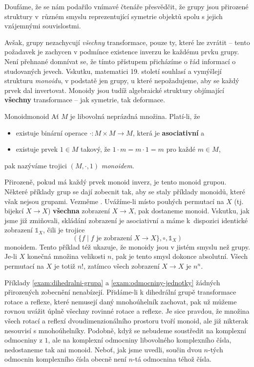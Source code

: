 Doufáme, že se nám podařilo vnímavé čtenáře přesvědčit, že grupy jsou přirozené
struktury v~různém smyslu reprezentující symetrie objektů spolu s jejich
vzájemnými souvislostmi.

Avšak, grupy nezachycují \emph{všechny} transformace, pouze ty, které lze
zvrátit -- tento požadavek je zachycen v podmínce existence inverzu ke každému
prvku grupy. Není přehnané domnívat se, že tímto přístupem přicházíme o řád
informací o studovaných jevech. Vskutku, matematici 19. století souhlasí a
vymýšlejí strukturu \emph{monoidu}, v podstatě jen grupy, u které nepožadujeme,
aby se každý prvek dal invertovat. Monoidy jsou tudíž algebraické struktury
objímající \textbf{všechny} transformace -- jak symetrie, tak deformace.

\begin{definition}{Monoid}{monoid}
 Ať $M$ je libovolná neprázdná množina. Platí-li, že
 \begin{itemize}
  \item existuje binární operace $ \cdot :M \times M \to M$, která je
   \textbf{asociativní} a
  \item existuje prvek $1 \in M$ takový, že $1 \cdot m = m \cdot 1 = m$ pro
   každé $m \in M$,
 \end{itemize}
 pak nazýváme trojici $(M, \cdot ,1)$ \emph{monoidem}.
\end{definition}

Přirozeně, pokud má každý prvek monoid inverz, je tento monoid grupou. Některé
příklady grup se dají zobecnit tak, aby se staly příklady monoidů, které však
nejsou grupami. Vezměme . Uvážíme-li místo
pouhých permutací na $X$ (tj. bijekcí $X \to X$) \textbf{všechna} zobrazení $X
\to X$, pak dostaneme monoid. Vskutku, jak jsme již zmiňovali, skládání
zobrazení je asociativní a máme k~dispozici identické zobrazení $\mathds{1}_X$,
čili je trojice
\[
 (\{f \mid f \text{ je zobrazení } X \to X\}, \circ ,\mathds{1}_X)
\]
monoidem. Tento příklad též ukazuje, že monoidy jsou v jistém smyslu 
než grupy. Je-li $X$ konečná množina velikosti $n$, pak je tento smysl dokonce
absolutní. Všech permutací na $X$ je totiž $n!$, zatímco všech zobrazení $X \to
X$ je $n^{n}$.

Příklady \ref{exam:dihedralni-grupa} a \ref{exam:odmocniny-jednotky} žádných
přirozených zobecnění nenabízejí. Přidáme-li k dihedrální grupě transformace
rotace a reflexe, které nemusejí daný mnohoúhelník zachovat, pak už můžeme
rovnou uvážit úplně všechny rovinné rotace a reflexe. Je sice pravdou, že
množina všech rotací a reflexí dvoudimenzionálního prostoru tvoří monoid, ale
již nikterak nesouvisí s mnohoúhelníky. Podobně, když se nebudeme soustředit na
komplexní odmocniny z $1$, ale na komplexní odmocniny libovolného komplexního
čísla, nedostaneme tak ani monoid. Neboť, jak jsme uvedli, součin dvou $n$-tých
odmocnin komplexního čísla obecně není $n$-tá odmocnina téhož čísla.

